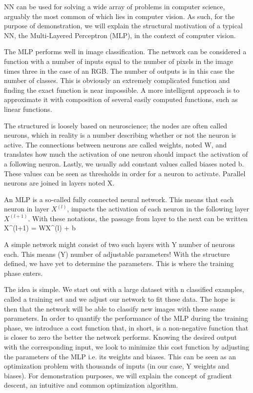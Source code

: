 \startsection[title=Classical Neural Networks ({\small Multilayer Perceptron})]
NN can be used for solving a wide array of problems in computer science, arguably the most common of which lies in computer vision.
 As such, for the purpose of demonstration, we will explain the structural motivation of a typical NN, the Multi-Layered Perceptron (MLP), in the context of computer vision.  

The MLP performs well in image classification. 
The network can be considered a function with a number of inputs equal to the number of pixels in the image times three in the case of an RGB.
The number of outputs is in this case the number of classes.
This is obviously an extremely complicated function and finding the exact function is near impossible.
A more intelligent approach is to approximate it with composition of several easily computed functions, such as linear functions.


The structured is loosely based on neuroscience; the nodes are often called neurons, which in reality is a number describing whether or not the neuron is active.
The connections between neurons are called weights, noted W, and translates how much the activation of one neuron should impact the activation of a following neuron.
Lastly, we usually add constant values called biases noted b. 
These values can be seen as thresholds in order for a neuron to activate. 
Parallel neurons are joined in layers noted X.

An MLP is a so-called fully connected neural network. 
This means that each neuron in layer $X^{(l)}$, impacts the activation of each neuron in the following layer $X^{(l+1)}$.
With these notations, the passage from layer to the next can be written
\startformula
X^{(l+1)} = WX^{(l)} + b
\stopformula
  
A simple network might consist of two such layers with Y number of neurons each.
This means (Y) number of adjustable parameters! With the structure defined, we have yet to determine the parameters.
This is where the training phase enters.  

\startsubsection[title=Training phase]
The idea is simple. We start out with a large dataset with n classified examples, called a training set and we adjust our network to fit these data.
The hope is then that the network will be able to classify new images with these same parameters.
In order to quantify the performance of the MLP during the training phase, we introduce a cost function that, in short, is a non-negative function that is closer to zero the better the network performs.
Knowing the desired output with the corresponding input, we look to minimize this cost function by adjusting the parameters of the MLP i.e. its weights and biases.
This can be seen as an optimization problem with thousands of inputs (in our case, Y weights and biases).
For demonstration purposes, we will explain the concept of gradient descent, an intuitive and common optimization algorithm.  
\stopsubsection

